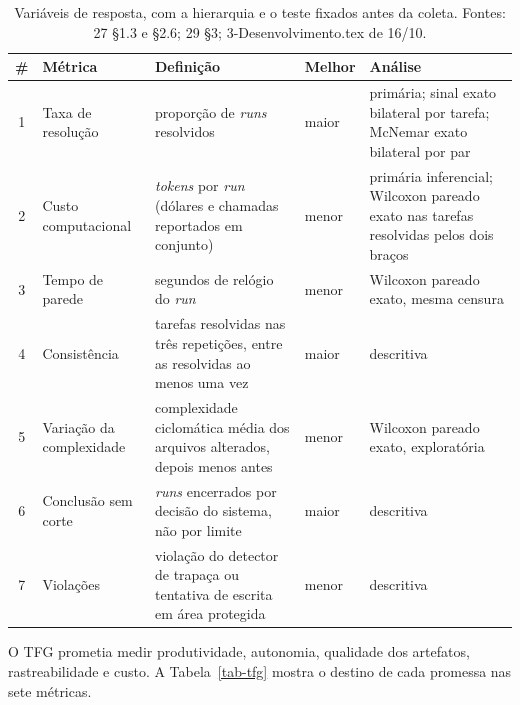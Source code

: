 \begin{table}[t]
\centering
\caption{Variáveis de resposta, com a hierarquia e o teste fixados antes da coleta. Fontes: 27 \S1.3 e \S2.6; 29 \S3; 3-Desenvolvimento.tex de 16/10.}
\label{tab-metricas}
\small
\begin{tabular}{cp{2.6cm}p{5.6cm}lp{4.6cm}}
\toprule
\# & Métrica & Definição & Melhor & Análise \\
\midrule
1 & Taxa de resolução & proporção de \textit{runs} resolvidos & maior & primária; sinal exato bilateral por tarefa; McNemar exato bilateral por par \\
2 & Custo computacional & \textit{tokens} por \textit{run} (dólares e chamadas reportados em conjunto) & menor & primária inferencial; Wilcoxon pareado exato nas tarefas resolvidas pelos dois braços \\
3 & Tempo de parede & segundos de relógio do \textit{run} & menor & Wilcoxon pareado exato, mesma censura \\
4 & Consistência & tarefas resolvidas nas três repetições, entre as resolvidas ao menos uma vez & maior & descritiva \\
5 & Variação da complexidade & complexidade ciclomática média dos arquivos alterados, depois menos antes & menor & Wilcoxon pareado exato, exploratória \\
6 & Conclusão sem corte & \textit{runs} encerrados por decisão do sistema, não por limite & maior & descritiva \\
7 & Violações & violação do detector de trapaça ou tentativa de escrita em área protegida & menor & descritiva \\
\bottomrule
\end{tabular}
\end{table}

O TFG prometia medir produtividade, autonomia, qualidade dos artefatos, rastreabilidade e custo. A Tabela~\ref{tab-tfg} mostra o destino de cada promessa nas sete métricas.

